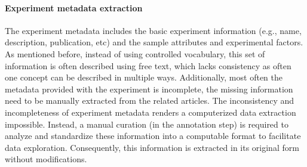 \paragraph{Experiment metadata extraction}
%
The experiment metadata includes the basic experiment information
(e.g., name, description, publication, etc) and the sample attributes
and experimental factors.
%
As mentioned before, instead of using controlled vocabulary, this set
of information is often described using free text, which lacks
consistency as often one concept can be described in multiple ways.
%
Additionally, most often the metadata provided with the experiment is
incomplete, the missing information need to be manually extracted from
the related articles.
%
The inconsistency and incompleteness of experiment metadata renders a
computerized data extraction impossible.  Instead, a manual curation
(in the annotation step) is required to analyze and standardize these
information into a computable format to facilitate data exploration.
%
Consequently, this information is extracted in its original form without
modifications.



